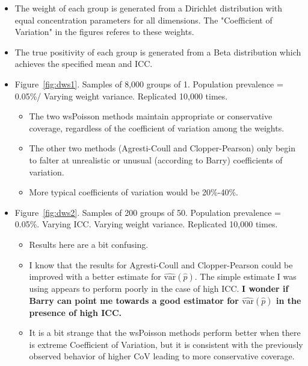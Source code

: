 \documentclass{article}
\begin{document}
\begin{itemize}
    \item The weight of each group is generated from a Dirichlet distribution with equal concentration parameters for all dimensions. The "Coefficient of Variation" in the figures referes to these weights.
    \item The true positivity of each group is generated from a Beta distribution which achieves the specified mean and ICC.
    \item Figure~\ref{fig:dws1}. Samples of 8,000 groups of 1. Population prevalence = 0.05\%/ Varying weight variance. Replicated 10,000 times.
    \begin{itemize}
        \item The two wsPoisson methods maintain appropriate or conservative coverage, regardless of the coefficient of variation among the weights.
        \item The other two methods (Agresti-Coull and Clopper-Pearson) only begin to falter at unrealistic or unusual (according to Barry) coefficients of variation.
        \item More typical coefficients of variation would be 20\%-40\%.
    \end{itemize}
    \item Figure~\ref{fig:dws2}. Samples of 200 groups of 50. Population prevalence = 0.05\%. Varying ICC. Varying weight variance. Replicated 10,000 times.
    \begin{itemize}
        \item Results here are a bit confusing.
        \item I know that the results for Agresti-Coull and Clopper-Pearson could be improved with a better estimate for \(\hat{\text{var}}(\hat{p}) \). The simple estimate I was using appears to perform poorly in the case of high ICC. \textbf{I wonder if Barry can point me towards a good estimator for \(\hat{\text{var}}(\hat{p}) \) in the presence of high ICC.}
        \item It is a bit strange that the wsPoisson methods perform better when there is extreme Coefficient of Variation, but it is consistent with the previously observed behavior of higher CoV leading to more conservative coverage.
    \end{itemize}
\end{itemize}
\end{document}
